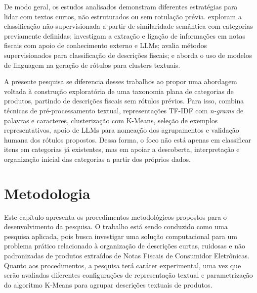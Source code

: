 \documentclass[english,brazilian]{UNISINOSmonografia}
\begin{document}
De modo geral, os estudos analisados demonstram diferentes estratégias para lidar com textos curtos, não estruturados ou sem rotulação prévia. \cite{hajyahia2019unsupervised} exploram a classificação não supervisionada a partir de similaridade semântica com categorias previamente definidas; \cite{martins2025extracao} investigam a extração e ligação de informações em notas fiscais com apoio de conhecimento externo e LLMs; \cite{santos2023classificacao} avalia métodos supervisionados para classificação de descrições fiscais; e \cite{murray2025using} aborda o uso de modelos de linguagem na geração de rótulos para clusters textuais.

A presente pesquisa se diferencia desses trabalhos ao propor uma abordagem voltada à construção exploratória de uma taxonomia plana de categorias de produtos, partindo de descrições fiscais sem rótulos prévios. Para isso, combina técnicas de pré-processamento textual, representações TF-IDF com \textit{n-grams} de palavras e caracteres, clusterização com K-Means, seleção de exemplos representativos, apoio de LLMs para nomeação dos agrupamentos e validação humana dos rótulos propostos. Dessa forma, o foco não está apenas em classificar itens em categorias já existentes, mas em apoiar a descoberta, interpretação e organização inicial das categorias a partir dos próprios dados.






\chapter{Metodologia}

Este capítulo apresenta os procedimentos metodológicos propostos para o desenvolvimento da pesquisa. O trabalho está sendo conduzido como uma pesquisa aplicada, pois busca investigar uma solução computacional para um problema prático relacionado à organização de descrições curtas, ruidosas e não padronizadas de produtos extraídos de Notas Fiscais de Consumidor Eletrônicas. Quanto aos procedimentos, a pesquisa terá caráter experimental, uma vez que serão avaliadas diferentes configurações de representação textual e parametrização do algoritmo K-Means para agrupar descrições textuais de produtos.
\end{document}
